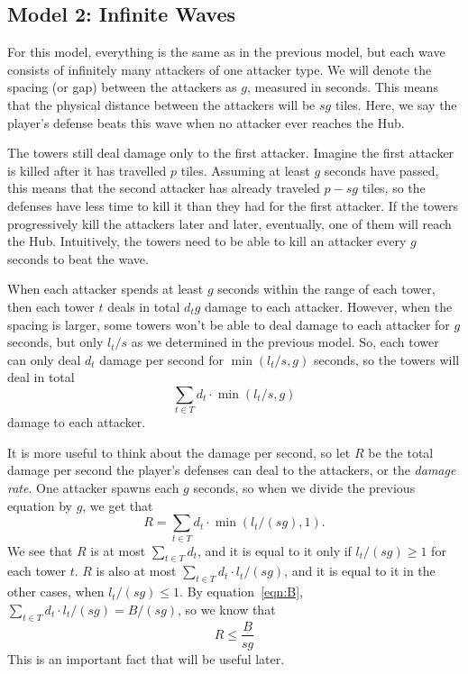 \subsection{Model 2: Infinite Waves}
For this model, everything is the same as in the previous model, but each wave consists of infinitely many attackers of one attacker type.
We will denote the spacing (or gap) between the attackers as $g$, measured in seconds.
This means that the physical distance between the attackers will be $sg$ tiles.
Here, we say the player's defense beats this wave when no attacker ever reaches the Hub.

The towers still deal damage only to the first attacker.
Imagine the first attacker is killed after it has travelled $p$ tiles.
Assuming at least $g$ seconds have passed, this means that the second attacker has already traveled $p - sg$ tiles, so the defenses have less time to kill it than they had for the first attacker.
If the towers progressively kill the attackers later and later, eventually, one of them will reach the Hub.
Intuitively, the towers need to be able to kill an attacker every $g$ seconds to beat the wave.

When each attacker spends at least $g$ seconds within the range of each tower, then each tower $t$ deals in total $d_t g$ damage to each attacker.
However, when the spacing is larger, some towers won't be able to deal damage to each attacker for $g$ seconds, but only $l_t / s$ as we determined in the previous model.
So, each tower can only deal $d_t$ damage per second for $\min(l_t / s, g)$ seconds, so the towers will deal in total
\begin{equation*}
    \sum_{t \in T} d_t \cdot \min(l_t / s, g)
\end{equation*}
damage to each attacker.

It is more useful to think about the damage per second, so let $R$ be the total damage per second the player's defenses can deal to the attackers, or the \emph{damage rate}.
One attacker spawns each $g$ seconds, so when we divide the previous equation by $g$, we get that
\begin{equation}\label{eqn:R}
    R = \sum_{t \in T} d_t \cdot \min(l_t / (s g), 1).
\end{equation}
We see that $R$ is at most $\sum_{t \in T} d_t$, and it is equal to it only if $l_t / (sg) \geq 1$ for each tower $t$.
$R$ is also at most $\sum_{t \in T} d_t \cdot l_t / (s g)$, and it is equal to it in the other cases, when $l_t / (sg) \leq 1$.
By equation~\ref{eqn:B}, $\sum_{t \in T} d_t \cdot l_t / (s g) = B/(s g)$, so we know that
\begin{equation}\label{eqn:RB}
    R \leq \frac{B}{s g}
\end{equation}
This is an important fact that will be useful later.

